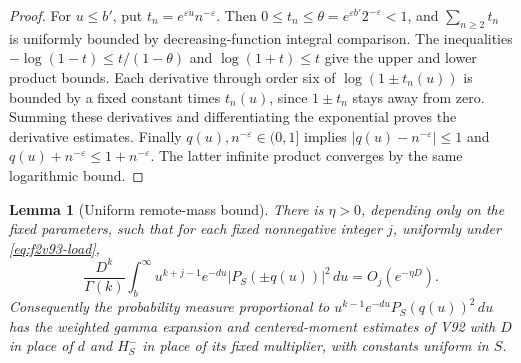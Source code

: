 \documentclass[11pt]{article}
\newtheorem{lemma}[theorem]{Lemma}
\theoremstyle{definition}
\theoremstyle{remark}
\begin{document}
\begin{proof}
For \(u\le b'\), put \(t_n=e^{\varepsilon u}n^{-\varepsilon}\).
Then \(0\le t_n\le\theta=e^{\varepsilon b'}2^{-\varepsilon}<1\),
and \(\sum_{n\ge2}t_n\) is uniformly bounded by decreasing-function
integral comparison.  The inequalities
\(-\log(1-t)\le t/(1-\theta)\) and \(\log(1+t)\le t\)
give the upper and lower product bounds.  Each derivative through
order six of \(\log(1\pm t_n(u))\) is bounded by a fixed constant
times \(t_n(u)\), since \(1\pm t_n\) stays away from zero.
Summing these derivatives and differentiating the exponential proves
the derivative estimates.  Finally \(q(u),n^{-\varepsilon}\in(0,1]\)
implies \(|q(u)-n^{-\varepsilon}|\le1\) and
\(q(u)+n^{-\varepsilon}\le1+n^{-\varepsilon}\).  The latter
infinite product converges by the same logarithmic bound.
\end{proof}

\begin{lemma}[Uniform remote-mass bound]
\label{lem:f2v93-tail}
There is \(\eta>0\), depending only on the fixed parameters, such
that for each fixed nonnegative integer \(j\), uniformly under
\eqref{eq:f2v93-load},
\begin{equation}
 \frac{D^k}{\Gamma(k)}\int_b^\infty
 u^{k+j-1}e^{-du}|P_S(\pm q(u))|^2\,du
 =O_j(e^{-\eta D}).
 \label{eq:f2v93-remote}
\end{equation}
Consequently the probability measure proportional to
\(u^{k-1}e^{-du}P_S(q(u))^2\,du\) has the weighted gamma
expansion and centered-moment estimates of V92 with \(D\) in place
of \(d\) and \(H_S^-\) in place of its fixed multiplier, with
constants uniform in \(S\).
\end{lemma}
\end{document}
